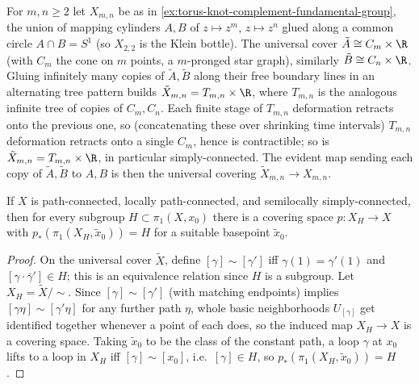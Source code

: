 \begin{example}
\label{ex:xmn-universal-cover-construction}
For $m,n\ge 2$ let $X_{m,n}$ be as in \cref{ex:torus-knot-complement-fundamental-group},
the union of mapping cylinders $A,B$ of $z\mapsto z^m$, $z\mapsto z^n$ glued along a
common circle $A\cap B=S^1$ (so $X_{2,2}$ is the Klein bottle). The universal cover
$\tilde A \cong C_m\times\R$ (with $C_m$ the cone on $m$ points, a $m$-pronged star
graph), similarly $\tilde B\cong C_n\times\R$. Gluing infinitely many copies of $\tilde A,\tilde B$
along their free boundary lines in an alternating tree pattern builds
$\tilde X_{m,n} = T_{m,n}\times\R$, where $T_{m,n}$ is the analogous infinite tree of
copies of $C_m,C_n$. Each finite stage of $T_{m,n}$ deformation retracts onto the
previous one, so (concatenating these over shrinking time intervals) $T_{m,n}$
deformation retracts onto a single $C_m$, hence is contractible; so is
$\tilde X_{m,n} = T_{m,n}\times\R$, in particular simply-connected. The evident map
sending each copy of $\tilde A,\tilde B$ to $A,B$ is then the universal covering
$\tilde X_{m,n}\to X_{m,n}$.


\end{example}

\begin{proposition}
\label{prop:covering-space-existence-for-subgroup}
If $X$ is path-connected, locally path-connected, and semilocally simply-connected,
then for every subgroup $H\subset\pi_1(X,x_0)$ there is a covering space
$p:X_H\to X$ with $p_*(\pi_1(X_H,\tilde x_0))=H$ for a suitable basepoint $\tilde x_0$.
\end{proposition}

\begin{proof}
On the universal cover $\tilde X$, define $[\gamma]\sim[\gamma']$ iff $\gamma(1)=\gamma'(1)$ and
$[\gamma\cdot\bar\gamma']\in H$; this is an equivalence relation since $H$ is a subgroup.
Let $X_H = \tilde X/{\sim}$. Since $[\gamma]\sim[\gamma']$ (with matching endpoints) implies
$[\gamma\eta]\sim[\gamma'\eta]$ for any further path $\eta$, whole basic neighborhoods
$U_{[\gamma]}$ get identified together whenever a point of each does, so the induced map
$X_H\to X$ is a covering space. Taking $\tilde x_0$ to be the class of the constant path,
a loop $\gamma$ at $x_0$ lifts to a loop in $X_H$ iff $[\gamma]\sim[x_0]$, i.e.\ $[\gamma]\in H$, so
$p_*(\pi_1(X_H,\tilde x_0)) = H$.
\end{proof}

